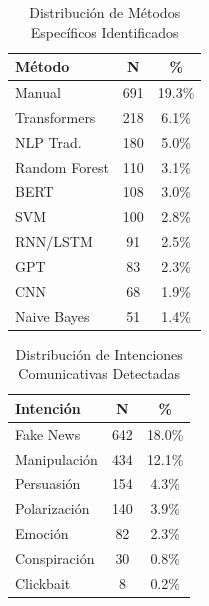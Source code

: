 
\usepackage{float}  %
\usepackage{array}  %


\begin{table}[H]
\centering
\caption{Distribución de Métodos Específicos Identificados}
\label{tab:latex_metodos}
\begin{tabular}{|l|c|c|}
\hline
\textbf{Método} & \textbf{N} & \textbf{\%} \\
\hline
Manual & 691 & 19.3\% \\
Transformers & 218 & 6.1\% \\
NLP Trad. & 180 & 5.0\% \\
Random Forest & 110 & 3.1\% \\
BERT & 108 & 3.0\% \\
SVM & 100 & 2.8\% \\
RNN/LSTM & 91 & 2.5\% \\
GPT & 83 & 2.3\% \\
CNN & 68 & 1.9\% \\
Naive Bayes & 51 & 1.4\% \\
\hline
\end{tabular}
\end{table}

\begin{table}[H]
\centering
\caption{Distribución de Intenciones Comunicativas Detectadas}
\label{tab:latex_intenciones}
\begin{tabular}{|l|c|c|}
\hline
\textbf{Intención} & \textbf{N} & \textbf{\%} \\
\hline
Fake News & 642 & 18.0\% \\
Manipulación & 434 & 12.1\% \\
Persuasión & 154 & 4.3\% \\
Polarización & 140 & 3.9\% \\
Emoción & 82 & 2.3\% \\
Conspiración & 30 & 0.8\% \\
Clickbait & 8 & 0.2\% \\
\hline
\end{tabular}
\end{table}

